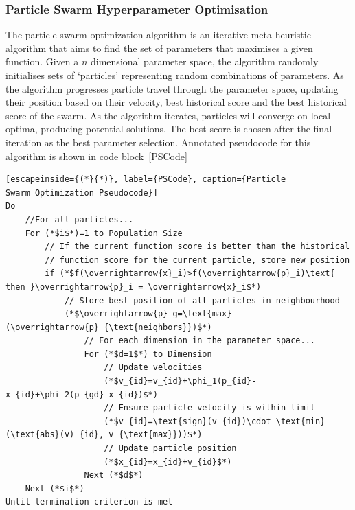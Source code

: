 \documentclass[titlepage, 12pt]{scrartcl} \usepackage{enumitem}
\begin{document}
\subsubsection{Particle Swarm Hyperparameter Optimisation}\label{PSOp}
The particle swarm optimization algorithm is an iterative meta-heuristic algorithm that
aims to find the set of parameters that maximises a given function. Given a
$n$ dimensional parameter space, the algorithm randomly initialises sets of
`particles' representing random combinations of parameters. As the algorithm
progresses particle travel through the parameter space, updating their
position based on their velocity, best historical score and the best historical
score of the swarm. As the algorithm iterates, particles will converge on local
optima, producing potential solutions. The best score is chosen after the final
iteration as the best parameter selection. Annotated pseudocode for this
algorithm is shown in code block~\ref{PSCode}~\parencite{Clerc2002}

\onehalfspacing
\begin{lstlisting}[escapeinside={(*}{*)}, label={PSCode}, caption={Particle
Swarm Optimization Pseudocode}]
Do
    //For all particles...
    For (*$i$*)=1 to Population Size
        // If the current function score is better than the historical
        // function score for the current particle, store new position
        if (*$f(\overrightarrow{x}_i)>f(\overrightarrow{p}_i)\text{ then }\overrightarrow{p}_i = \overrightarrow{x}_i$*)
            // Store best position of all particles in neighbourhood
            (*$\overrightarrow{p}_g=\text{max}(\overrightarrow{p}_{\text{neighbors}})$*)
                // For each dimension in the parameter space...
                For (*$d=1$*) to Dimension
                    // Update velocities
                    (*$v_{id}=v_{id}+\phi_1(p_{id}-x_{id}+\phi_2(p_{gd}-x_{id})$*)
                    // Ensure particle velocity is within limit
                    (*$v_{id}=\text{sign}(v_{id})\cdot \text{min}(\text{abs}(v)_{id}, v_{\text{max}}))$*)
                    // Update particle position
                    (*$x_{id}=x_{id}+v_{id}$*)
                Next (*$d$*)
    Next (*$i$*)
Until termination criterion is met
\end{lstlisting}
\doublespacing
\end{document}
